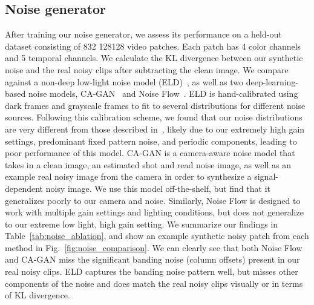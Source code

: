 \documentclass[final]{cvpr}
\begin{document}
\subsection{Noise generator}

After training our noise generator, we assess its performance on a held-out dataset consisting of 832 128128 video patches. Each patch has 4 color channels and 5 temporal channels. We calculate the KL divergence between our synthetic noise and the real noisy clips after subtracting the clean image. We compare against a non-deep low-light noise model (ELD)~\cite{wei2020physics}, as well as two deep-learning-based noise models, CA-GAN~\cite{chang2020learning} and Noise Flow~\cite{abdelhamed2019noise}. ELD is hand-calibrated using dark frames and grayscale frames to fit to several distributions for different noise sources. Following this calibration scheme, we found that our noise distributions are very different from those described in~\cite{wei2020physics}, likely due to our extremely high gain settings, predominant fixed pattern noise, and periodic components, leading to poor performance of this model. CA-GAN is a camera-aware noise model that takes in a clean image, an estimated shot and read noise image, as well as an example real noisy image from the camera in order to synthesize a signal-dependent noisy image. We use this model off-the-shelf, but find that it generalizes poorly to our camera and noise. Similarly, Noise Flow is designed to work with multiple gain settings and lighting conditions, but does not generalize to our extreme low light, high gain setting. We summarize our findings in Table~\ref{tab:noise_ablation}, and show an example synthetic noisy patch from each method in Fig.~\ref{fig:noise_comparison}. We can clearly see that both Noise Flow and CA-GAN miss the significant banding noise (column offsets) present in our real noisy clips. ELD captures the banding noise pattern well, but misses other components of the noise and does match the real noisy clips visually or in terms of KL divergence. 
 \vspace{-2mm}
\end{document}
